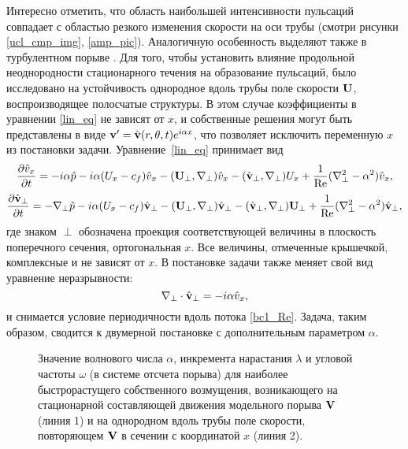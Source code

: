 Интересно отметить, что область наибольшей интенсивности пульсаций совпадает с областью резкого изменения скорости на оси трубы (смотри рисунки \ref{ucl_cmp_img}, \ref{amp_pic}). Аналогичную особенность выделяют также в турбулентном порыве \cite{Hof2010}. Для того, чтобы установить влияние продольной неоднородности стационарного течения на образование пульсаций, было исследовано на устойчивость однородное вдоль трубы поле скорости $\mathbf{U}$, воспроизводящее полосчатые структуры. В этом случае коэффициенты в уравнении \eqref{lin_eq} не зависят от $x$, и собственные решения могут быть представлены в виде $\mathbf{v}' = \hat {\mathbf{v}}(r,\theta,t) e^{i \alpha x}$, что позволяет исключить переменную $x$ из постановки задачи. Уравнение~\eqref{lin_eq} принимает вид
\begin{multline*}
\frac{\partial \hat v_x}{\partial t} = - i \alpha \hat p - i \alpha (U_x - c_f) \hat v_x - (\mathbf{U}_{\perp},\nabla_{\perp}) \hat v_x - 
(\hat {\mathbf{v}}_{\perp}, \nabla_{\perp}) U_x + \frac{1}{\operatorname{Re}}( \nabla_{\perp}^2 - \alpha^2 ) \hat v_x,
\end{multline*}
\begin{multline*}
\frac{\partial \hat {\mathbf{v}}_{\perp}}{\partial t} =  - \nabla_{\perp} \hat p - i \alpha (U_x - c_f) \hat {\mathbf{v}}_{\perp} - (\mathbf{U}_{\perp},\nabla_{\perp}) \hat {\mathbf{v}}_{\perp} - (\hat {\mathbf{v}}_{\perp}, \nabla_{\perp}) \mathbf{U}_{\perp} + \frac{1}{\operatorname{Re}}( \nabla_{\perp}^2 - \alpha^2 ) \hat {\mathbf{v}}_{\perp}, 
\end{multline*}
где знаком $\perp$ обозначена проекция соответствующей величины в плоскость поперечного сечения, ортогональная $x$. Все величины, отмеченные крышечкой, комплексные и не зависят от $x$. В постановке задачи также меняет свой вид уравнение неразрывности:
\begin{equation*}
\nabla_{\perp} \cdot \hat {\mathbf{v}}_{\perp} = - i \alpha \hat v_x, 
\end{equation*}
и снимается условие периодичности вдоль потока \eqref{bc1_Re}. Задача, таким образом, сводится к двумерной постановке с дополнительным параметром $\alpha$. 

\begin{figure}
\caption{Значение волнового числа $\alpha$, инкремента нарастания $\lambda$ и угловой частоты $\omega$ (в системе отсчета порыва) для наиболее быстрорастущего собственного возмущения, возникающего на стационарной составляющей движения модельного порыва $\mathbf{V}$ (линия 1) и на однородном вдоль трубы поле скорости, повторяющем $\mathbf{V}$ в сечении с координатой $x$ (линия 2).}
\label{cs_lin_pic}
\end{figure}

